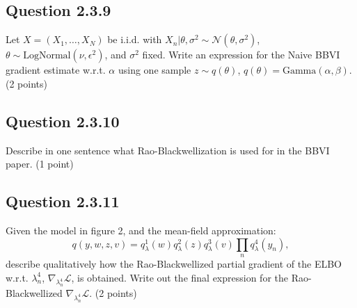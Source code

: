 \documentclass{article}
\begin{document}
\begin{multicols}{2}
\subsection*{Question 2.3.9}
Let \(X = (X_1, \dots, X_N)\) be i.i.d. with \(X_n | \theta, \sigma^2 \sim \mathcal{N}(\theta, \sigma^2)\), \(\theta \sim \text{LogNormal}(\nu, \epsilon^2)\), and \(\sigma^2\) fixed. Write an expression for the Naive BBVI gradient estimate w.r.t. \(\alpha\) using one sample \(z \sim q(\theta)\), \(q(\theta) = \text{Gamma}(\alpha, \beta)\). (2 points)


\subsection*{Question 2.3.10}
Describe in one sentence what Rao-Blackwellization is used for in the BBVI paper. (1 point)

\subsection{Question 2.3.11}
Given the model in figure 2, and the mean-field approximation:  
\[
q(y, w, z, v) = q_\lambda^1(w)q_\lambda^2(z)q_\lambda^3(v)\prod_n q_\lambda^4(y_n),
\]
describe qualitatively how the Rao-Blackwellized partial gradient of the ELBO w.r.t. \(\lambda_n^4\), \(\nabla_{\lambda_n^4} \mathcal{L}\), is obtained. Write out the final expression for the Rao-Blackwellized \(\nabla_{\lambda_n^4} \mathcal{L}\). (2 points)







\end{multicols}

\clearpage
{}
\end{document}

